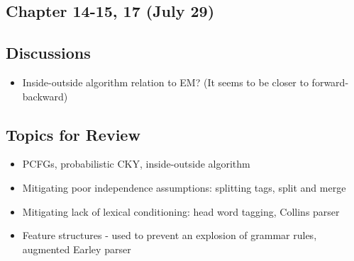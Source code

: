 \subsection{Chapter 14-15, 17 (July 29)}
\subsection*{Discussions}
\begin{itemize}
\item Inside-outside algorithm relation to EM? (It seems to be closer to forward-backward)
\end{itemize}

\subsection*{Topics for Review}
\begin{itemize}
\item PCFGs, probabilistic CKY, inside-outside algorithm
\item Mitigating poor independence assumptions: splitting tags, split and merge
\item Mitigating lack of lexical conditioning: head word tagging, Collins parser
\item Feature structures - used to prevent an explosion of grammar rules, augmented Earley parser
\end{itemize}
